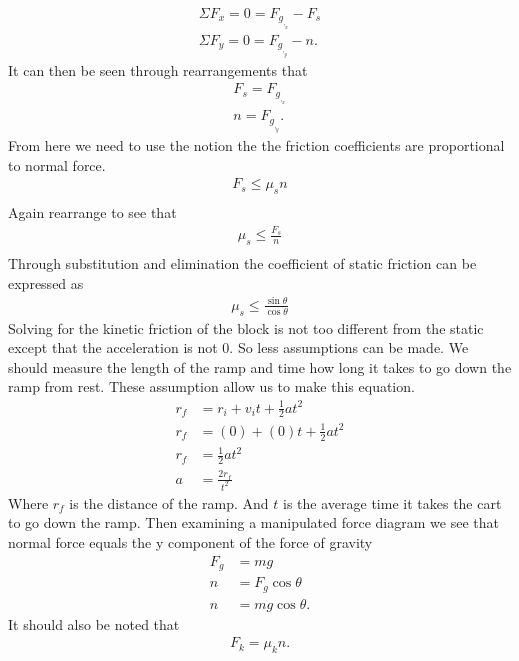 \documentclass{article}
\begin{document}
    \begin{align*}
        \Sigma{}F_x = 0 = F_g_,_x - F_s\\
        \Sigma{}F_y = 0 = F_g_,_y - n.
    \end{align*}
    It can then be seen through rearrangements that
    \begin{align*}
         F_s = F_g_,_x \\
         n = F_g_,_y .
    \end{align*}
    From here we need to use the notion the the friction coefficients are proportional to normal force. 
    \begin{align*}
        F_s \leq \mu_sn\\
    \end{align*}
    Again rearrange to see that
    \begin{align*}
        \mu_s \leq \frac{F_s}{n}\\
    \end{align*}
    Through substitution and elimination the coefficient of static friction can be expressed as
    \begin{align*}
        \mu_s \leq \frac{\sin\theta}{\cos\theta}
    \end{align*}
    Solving for the kinetic friction of the block is not too different from the static except that the acceleration is not 0. So less assumptions can be made. We should measure the length of the ramp and time how long it takes to go down the ramp from rest. These assumption allow us to make this equation.
    \begin{align*}
        r_f &= r_i + v_it + \frac{1}{2}at^2\\
        r_f &= (0) + (0)t + \frac{1}{2}at^2\\
        r_f &= \frac{1}{2}at^2\\
        a &= \frac{2r_f}{t^2}
    \end{align*}
    Where $r_f$ is the distance of the ramp. And $t$ is the average time it takes the cart to go down the ramp. Then examining a manipulated force diagram we see that normal force equals the y component of the force of gravity
    \begin{align*}
        F_g &= mg\\
        n &= F_g\cos\theta\\
        n &= mg\cos\theta.
    \end{align*}
    It should also be noted that
    \begin{align*}
        F_k = \mu_kn.
    \end{align*}
\end{document}
